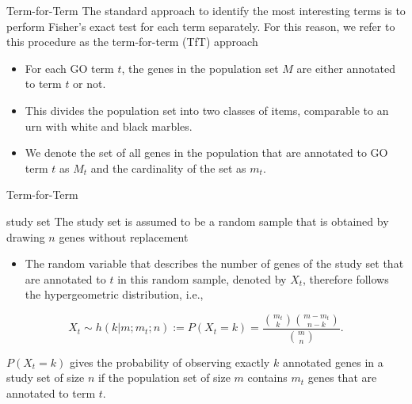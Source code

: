 \documentclass{beamer}
\begin{document}
\begin{frame}{Term-for-Term}
 The standard approach to identify the most interesting terms is to
perform Fisher's exact test for each term separately. For this reason,
we refer to this procedure as the term-for-term (TfT)
approach

\begin{itemize}
 \item For each GO term $t$, the genes in the population set $M$ are either
annotated to term $t$ or not.
\item This divides the population set into two
classes of items, comparable to an urn with white and
black marbles. 
\item We denote the set of all genes in the population that
are annotated to GO term $t$ as  $M_t$ and the cardinality of the set
as $m_t$.
\end{itemize}

 
\end{frame}
\begin{frame}{Term-for-Term}
\begin{mybluebox}{study set}
 The study set is assumed to be a random sample that is
obtained by drawing $n$ genes without replacement
\end{mybluebox}
 \begin{itemize}
 \item The random variable that describes the number of genes of
the study set that are annotated to $t$ in this random sample, denoted
by $X_t$, therefore follows the 
hypergeometric distribution, i.e.,
 \end{itemize}



\begin{equation}
X_t \sim h(k|m;m_t;n) := P(X_t=k) = \frac{\displaystyle{m_t \choose
    k}\displaystyle{{m - m_t} 
\choose {n - k}}}{\displaystyle{m \choose n}}.
\label{eq:hypergeometric-term-for-term}
\end{equation}
\begin{tiny}
 $P(X_t=k)$ gives the probability of observing exactly $k$
annotated genes in a study set of size $n$ if the population set of
size $m$ contains $m_t$ genes that are annotated to term $t$.
\end{tiny}
\end{frame}
\end{document}
